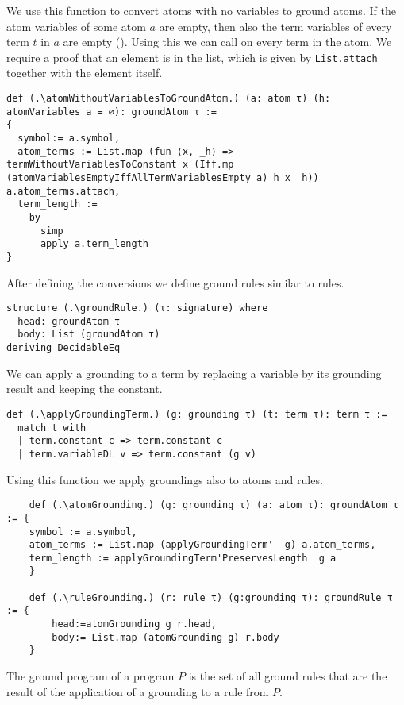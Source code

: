 We use this function to convert atoms with no variables to ground atoms. If the atom variables of some atom $a$ are empty, then also the term variables of every term $t$ in $a$ are empty (\atomVariablesEmptyIffAllTermVariablesEmpty). Using this we can call \termWithoutVariablesToConstant on every term in the atom. We require a proof that an element is in the list, which is given by \lstinline|List.attach| together with the element itself.

\begin{lstlisting}
def (.\atomWithoutVariablesToGroundAtom.) (a: atom τ) (h: atomVariables a = ∅): groundAtom τ :=
{
  symbol:= a.symbol,
  atom_terms := List.map (fun ⟨x, _h⟩ => termWithoutVariablesToConstant x (Iff.mp (atomVariablesEmptyIffAllTermVariablesEmpty a) h x _h)) a.atom_terms.attach,
  term_length :=
    by
      simp
      apply a.term_length
}
\end{lstlisting}

After defining the conversions we define ground rules similar to rules.

\begin{lstlisting}
structure (.\groundRule.) (τ: signature) where
  head: groundAtom τ
  body: List (groundAtom τ)
deriving DecidableEq
\end{lstlisting}

We can apply a grounding to a term by replacing a variable by its grounding result and keeping the constant.
\begin{lstlisting}
def (.\applyGroundingTerm.) (g: grounding τ) (t: term τ): term τ :=
  match t with
  | term.constant c => term.constant c
  | term.variableDL v => term.constant (g v)
\end{lstlisting}

Using this function we apply groundings also to atoms and rules. 

\begin{lstlisting}
    def (.\atomGrounding.) (g: grounding τ) (a: atom τ): groundAtom τ := {
    symbol := a.symbol, 
    atom_terms := List.map (applyGroundingTerm'  g) a.atom_terms, 
    term_length := applyGroundingTerm'PreservesLength  g a
    }

    def (.\ruleGrounding.) (r: rule τ) (g:grounding τ): groundRule τ := {
        head:=atomGrounding g r.head, 
        body:= List.map (atomGrounding g) r.body 
    }

\end{lstlisting}

The ground program of a program $P$ is the set of all ground rules that are the result of the application of a grounding to a rule from $P$.

